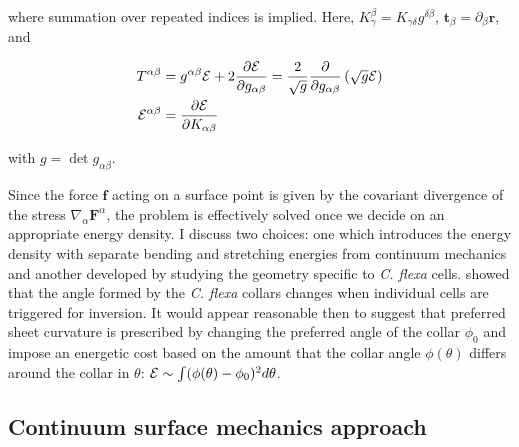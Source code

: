 \noindent where summation over repeated indices is implied. Here, $K_\gamma^\beta = K_{\gamma \delta}g^{\delta \beta}$, $\bm{t}_\beta = \partial_\beta \bm{r}$, and 

\begin{align*}
    T^{\alpha\beta} &= g^{\alpha\beta} \mathcal{E} + 2 \frac{\partial \mathcal{E}}{\partial g_{\alpha\beta}} = \frac{2}{\sqrt{g}} \frac{\partial}{\partial g_{\alpha\beta}} \left(\sqrt{g}\mathcal{E} \right) \\
    \mathcal{E}^{\alpha\beta} &= \frac{\partial \mathcal{E}}{\partial K_{\alpha\beta}}
\end{align*}

\noindent with $g = \det{g_{\alpha\beta}}$.

Since the force $\bm{f}$ acting on a surface point is given by the covariant divergence of the stress $\nabla_\alpha \bm{F}^\alpha$, the problem is effectively solved once we decide on an appropriate energy density. 
I discuss two choices: one which introduces the energy density with separate bending and stretching energies from continuum mechanics and another developed by studying the geometry specific to \textit{C. flexa} cells.
\citet{brunet2019} showed that the angle formed by the \textit{C. flexa} collars changes when individual cells are triggered for inversion. 
It would appear reasonable then to suggest that preferred sheet curvature is prescribed by changing the preferred angle of the collar $\phi_0$ and impose an energetic cost based on the amount that the collar angle $\phi(\theta)$ differs around the collar in $\theta$: $\mathcal{E} \sim \int (\phi(\theta) - \phi_0)^2 d\theta$.

\subsection{Continuum surface mechanics approach} \label{subsec:cts}

